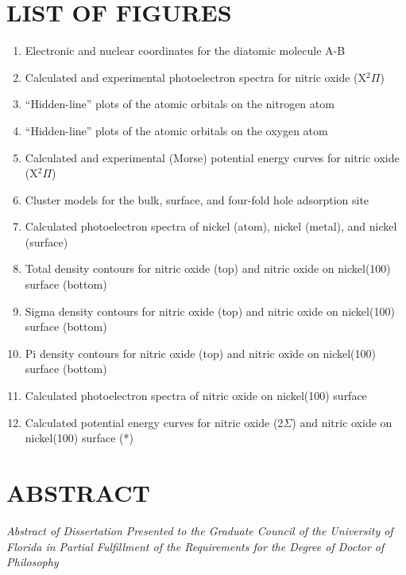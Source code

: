 \documentclass[12pt,letterpaper]{report}
\begin{document}
\chapter*{LIST OF FIGURES}
\begin{enumerate}
    \item Electronic and nuclear coordinates for the diatomic molecule A-B 
    \item Calculated and experimental photoelectron spectra for nitric oxide (X$^2\Pi$) 
    \item ``Hidden-line'' plots of the atomic orbitals on the nitrogen atom 
    \item ``Hidden-line'' plots of the atomic orbitals on the oxygen atom 
    \item Calculated and experimental (Morse) potential energy curves for nitric oxide (X$^2\Pi$) 
    \item Cluster models for the bulk, surface, and four-fold hole adsorption site 
    \item Calculated photoelectron spectra of nickel (atom), nickel (metal), and nickel (surface) 
    \item Total density contours for nitric oxide (top) and nitric oxide on nickel(100) surface (bottom) 
    \item Sigma density contours for nitric oxide (top) and nitric oxide on nickel(100) surface (bottom) 
    \item Pi density contours for nitric oxide (top) and nitric oxide on nickel(100) surface (bottom) 
    \item Calculated photoelectron spectra of nitric oxide on nickel(100) surface 
    \item Calculated potential energy curves for nitric oxide (2$\Sigma$) and nitric oxide on nickel(100) surface (*) 
\end{enumerate}

\newpage
\chapter*{ABSTRACT}

\noindent\textit{Abstract of Dissertation Presented to the Graduate Council of the University of Florida in Partial Fulfillment of the Requirements for the Degree of Doctor of Philosophy}

\vspace{0.5in}
\end{document}
